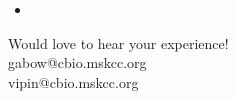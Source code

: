 \documentclass[11pt]{beamer}
\makeatletter
\newcommand{\thankyou}
{\begin{center} Would love to hear your experience! \\  gabow@cbio.mskcc.org \\ vipin@cbio.mskcc.org \end{center}}
\makeatother
\begin{document}
%
\begin{frame}[plain]
    \frametitle{}
    \begin{itemize}
        \item[] 
    \end{itemize}
\end{frame}
% 
%
\begin{frame}[plain]
    \thankyou
\end{frame}
\end{document}
